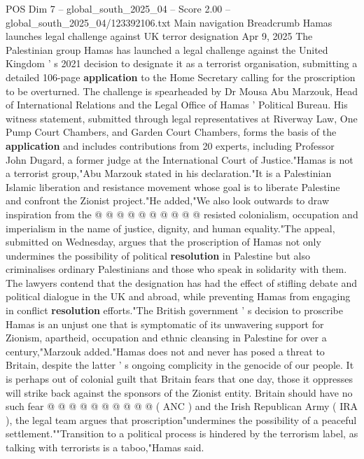 \begin{textsample}{POS Dim 7 – global\_south\_2025\_04 – Score 2.00 – global\_south\_2025\_04/123392106.txt}  \label{ex:f7_pos_142}
Main navigation Breadcrumb Hamas launches legal challenge against UK terror designation Apr 9, 2025 The Palestinian group Hamas has launched a legal challenge against the United Kingdom ' s 2021 decision to designate it as a terrorist organisation, submitting a detailed 106-page \textbf{application} to the Home Secretary calling for the proscription to be overturned.
The challenge is spearheaded by Dr Mousa Abu Marzouk, Head of International Relations and the Legal Office of Hamas ' Political Bureau.
His witness statement, submitted through legal representatives at Riverway Law, One Pump Court Chambers, and Garden Court Chambers, forms the basis of the \textbf{application} and includes contributions from 20 experts, including Professor John Dugard, a former judge at the International Court of Justice."Hamas is not a terrorist group,"Abu Marzouk stated in his declaration."It is a Palestinian Islamic liberation and resistance movement whose goal is to liberate Palestine and confront the Zionist project."He added,"We also look outwards to draw inspiration from the @ @ @ @ @ @ @ @ @ @ resisted colonialism, occupation and imperialism in the name of justice, dignity, and human equality."The appeal, submitted on Wednesday, argues that the proscription of Hamas not only undermines the possibility of political \textbf{resolution} in Palestine but also criminalises ordinary Palestinians and those who speak in solidarity with them.
The lawyers contend that the designation has had the effect of stifling debate and political dialogue in the UK and abroad, while preventing Hamas from engaging in conflict \textbf{resolution} efforts."The British government ' s decision to proscribe Hamas is an unjust one that is symptomatic of its unwavering support for Zionism, apartheid, occupation and ethnic cleansing in Palestine for over a century,"Marzouk added."Hamas does not and never has posed a threat to Britain, despite the latter ' s ongoing complicity in the genocide of our people.
It is perhaps out of colonial guilt that Britain fears that one day, those it oppresses will strike back against the sponsors of the Zionist entity.
Britain should have no such fear @ @ @ @ @ @ @ @ @ @ ( ANC ) and the Irish Republican Army ( IRA ), the legal team argues that proscription"undermines the possibility of a peaceful settlement.""Transition to a political process is hindered by the terrorism label, as talking with terrorists is a taboo,"Hamas said.

\end{textsample}
